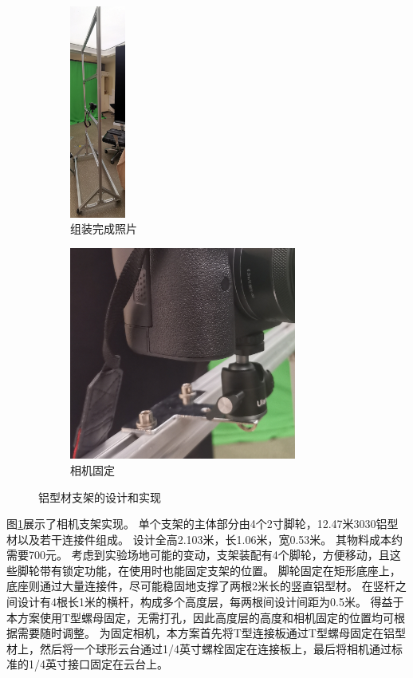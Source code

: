 \begin{figure}
    \centering
    \begin{subfigure}[b]{0.2\textwidth}
        \centering
        \includegraphics[height=7cm]{figures/frame-impl}
        \caption{组装完成照片}
    \end{subfigure}
    \begin{subfigure}[b]{0.47\textwidth}
        \centering
        \includegraphics[height=7cm]{figures/frame-camera}
        \caption{相机固定}
    \end{subfigure}
    \caption{铝型材支架的设计和实现}
    \label{fig:frame}
\end{figure}

图\ref{fig:frame}展示了相机支架实现。
单个支架的主体部分由4个2寸脚轮，12.47米3030铝型材以及若干连接件组成。
设计全高2.103米，长1.06米，宽0.53米。
其物料成本约需要700元。
考虑到实验场地可能的变动，支架装配有4个脚轮，方便移动，且这些脚轮带有锁定功能，在使用时也能固定支架的位置。
脚轮固定在矩形底座上，底座则通过大量连接件，尽可能稳固地支撑了两根2米长的竖直铝型材。
在竖杆之间设计有4根长1米的横杆，构成多个高度层，每两根间设计间距为0.5米。
得益于本方案使用T型螺母固定，无需打孔，因此高度层的高度和相机固定的位置均可根据需要随时调整。
为固定相机，本方案首先将T型连接板通过T型螺母固定在铝型材上，然后将一个球形云台通过1/4英寸螺栓固定在连接板上，最后将相机通过标准的1/4英寸接口固定在云台上。

